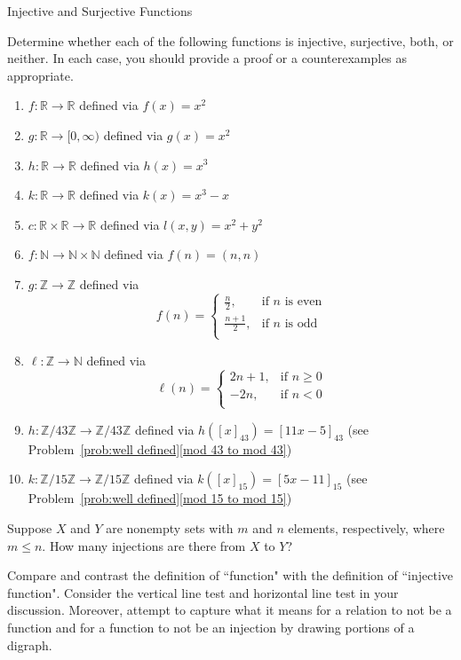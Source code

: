 \begin{section}{Injective and Surjective Functions}
\begin{problem}\label{prob:injective surjective functions}
Determine whether each of the following functions is injective, surjective, both, or neither.  In each case, you should provide a proof or a counterexamples as appropriate.
\begin{enumerate}[label=\textrm{(\alph*)}]
\item $f:\mathbb{R}\to \mathbb{R}$ defined via $f(x)=x^{2}$
\item $g:\mathbb{R}\to [0,\infty)$ defined via $g(x)=x^{2}$
\item $h:\mathbb{R}\to \mathbb{R}$ defined via $h(x)=x^{3}$
\item $k:\mathbb{R}\to \mathbb{R}$ defined via $k(x)=x^{3}-x$
\item\label{circles} $c: \mathbb{R}\times \mathbb{R}\to \mathbb{R}$ defined via $l(x,y)=x^{2}+y^{2}$
\item $f:\mathbb{N}\to \mathbb{N}\times \mathbb{N}$ defined via $f(n)=(n,n)$
\item $g:\mathbb{Z}\to \mathbb{Z}$ defined via
\[
f(n)=\begin{cases}
\frac{n}{2}, & \text{if }n\text{ is even}\\
\frac{n+1}{2}, & \text{if }n\text{ is odd}\\
\end{cases}
\]
\item $\ell:\mathbb{Z}\to \mathbb{N}$ defined via
\[
\ell(n)=\begin{cases}
2n+1, & \text{if }n\geq 0\\
-2n, & \text{if }n<0\\
\end{cases}
\]
\item $h:\mathbb{Z}/43\mathbb{Z}\to \mathbb{Z}/43\mathbb{Z}$ defined via $h([x]_{43})=[11x-5]_{43}$ (see Problem~\ref{prob:well defined}\ref{mod 43 to mod 43})
\item $k:\mathbb{Z}/15\mathbb{Z}\to \mathbb{Z}/15\mathbb{Z}$ defined via $k([x]_{15})=[5x-11]_{15}$ (see Problem~\ref{prob:well defined}\ref{mod 15 to mod 15})
\end{enumerate}
\end{problem}

\begin{problem}
Suppose $X$ and $Y$ are nonempty sets with $m$ and $n$ elements, respectively, where $m\leq  n$. How many injections are there from $X$ to $Y$?
\end{problem}

\begin{problem}
Compare and contrast the definition of ``function" with the definition of ``injective function". Consider the vertical line test and horizontal line test in your discussion.  Moreover, attempt to capture what it means for a relation to not be a function and for a function to not be an injection by drawing portions of a digraph.
\end{problem}


\end{section}

